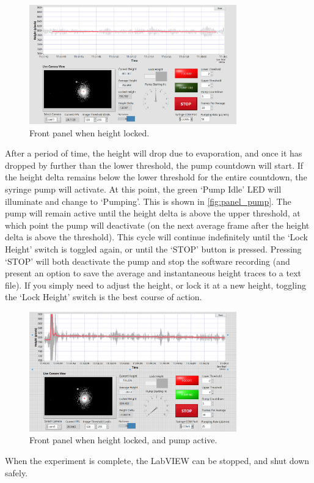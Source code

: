 \documentclass[11pt,a4paper,twoside]{article}
\begin{document}
\begin{figure}[h]
\centering
\includegraphics[width=0.8\textwidth]{panel_locked_nopump}
\caption{Front panel when height locked.}\label{fig:panel_locked}
\end{figure}
After a period of time, the height will drop due to evaporation, and once it has dropped by further than the lower threshold, the pump countdown will start. If the height delta remains below the lower threshold for the entire countdown, the syringe pump will activate. At this point, the green `Pump Idle' LED will illuminate and change to `Pumping'. This is shown in \autoref{fig:panel_pump}. The pump will remain active until the height delta is above the upper threshold, at which point the pump will deactivate (on the next average frame after the height delta is above the threshold). This cycle will continue indefinitely until the `Lock Height' switch is toggled again, or until the `STOP' button is pressed. Pressing `STOP' will both deactivate the pump and stop the software recording (and present an option to save the average and instantaneous height traces to a text file). If you simply need to adjust the height, or lock it at a new height, toggling the `Lock Height' switch is the best course of action. 
\begin{figure}[h]
\centering
\includegraphics[width=0.8\textwidth]{panel_locked_pumping}
\caption{Front panel when height locked, and pump active.}\label{fig:panel_pump}
\end{figure}
When the experiment is complete, the LabVIEW can be stopped, and shut down safely. 
\end{document}
